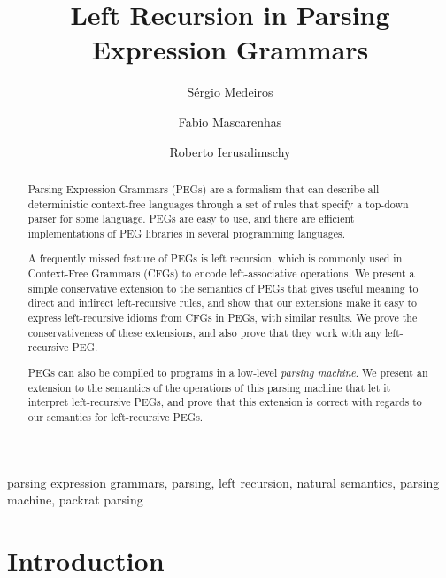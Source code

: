 \begin{frontmatter}

\title{Left Recursion in Parsing Expression Grammars}

\author{S\'{e}rgio Medeiros}
\address{Department of Computer Science -- UFS -- Aracaju -- Brazil} 

\author{Fabio Mascarenhas}
\address{Department of Computer Science -- UFRJ -- Rio de Janeiro -- Brazil} 

\author{Roberto Ierusalimschy}
\address{Department of Computer Science -- PUC-Rio -- Rio de Janeiro -- Brazil} 

\begin{abstract}
Parsing Expression Grammars (PEGs) are a formalism
that can describe all deterministic context-free
languages through a set of rules that specify a top-down parser for
some language. PEGs are easy to use, and there are efficient
implementations of PEG libraries in several programming languages. 

A frequently missed feature of PEGs is left recursion, which is
commonly used in Context-Free Grammars (CFGs) to encode left-associative
operations. We present a simple conservative extension to the
semantics of PEGs that gives useful meaning to direct and indirect
left-recursive rules, and show that our extensions make it easy to
express left-recursive idioms from CFGs in PEGs, with similar
results. We prove the conservativeness of these extensions, and also
prove that they work with any left-recursive PEG.

PEGs can also be compiled to programs in a low-level {\em parsing
  machine}. We present an extension to the semantics of the operations
of this parsing machine that let it interpret left-recursive PEGs, and
prove that this extension is correct with regards to our semantics for
left-recursive PEGs.
\end{abstract}

\begin{keyword}
parsing expression grammars\sep
parsing\sep
left recursion\sep
natural semantics\sep
parsing machine\sep
packrat parsing
\end{keyword}

\end{frontmatter}
     
\section{Introduction}
\label{sec:intro}

